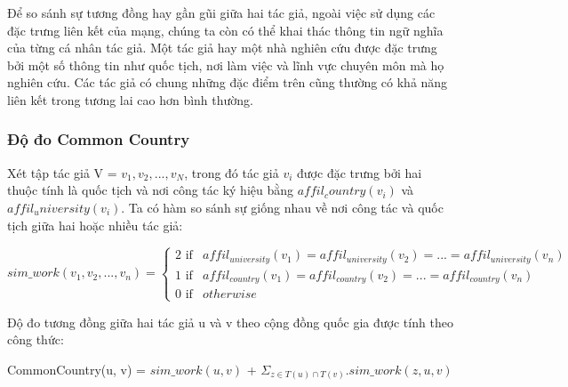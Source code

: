 \documentclass{article}
\begin{document}
Để so sánh sự tương đồng hay gần gũi giữa hai tác giả, ngoài việc sử dụng các đặc trưng liên kết của mạng, chúng ta còn có thể khai thác thông tin ngữ nghĩa của từng cá nhân tác giả. Một tác giả hay một nhà nghiên cứu được đặc trưng bởi một số thông tin như quốc tịch, nơi làm việc và lĩnh vực chuyên môn mà họ nghiên cứu. Các tác giả có chung những đặc điểm trên cũng thường có khả năng liên kết trong tương lai cao hơn bình thường.

\subsubsection{Độ đo Common Country}

Xét tập tác giả V = {$v_1, v_2, ..., v_N$}, trong đó tác giả $v_i$ được đặc trưng bởi hai thuộc tính là quốc tịch và nơi công tác ký hiệu bằng $affil_country(v_i)$ và $affil_university(v_i)$. Ta có hàm so sánh sự giống nhau về nơi công tác và quốc tịch giữa hai hoặc nhiều tác giả:

\begin{center}

\[
  sim\_work (v_1, v_2, ..., v_n) =
  \begin{cases}
    2 \text{ if} & affil_{university}(v_1) = affil_{university}(v_2) = ... = affil_{university}(v_n) \\
    1 \text{ if} & affil_{country}(v_1) = affil_{country}(v_2) = ... = affil_{country}(v_n) \\
    0 \text{ if} & otherwise
  \end{cases}
\]

\end{center}

Độ đo tương đồng giữa hai tác giả u và v theo cộng đồng quốc gia được tính theo công thức:

\begin{center}

CommonCountry(u, v) = $sim\_work(u, v)$ + $\Sigma_{z \in T(u) \cap T(v)} . sim\_work(z, u, v)$

\end{center}
\end{document}

